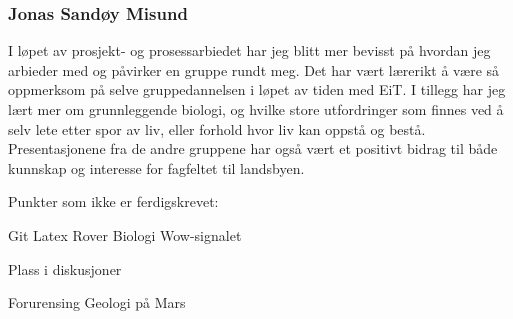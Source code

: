 \subsubsection{Jonas Sandøy Misund}
I løpet av prosjekt- og prosessarbiedet har jeg blitt mer bevisst på hvordan jeg arbieder med og påvirker en gruppe rundt meg.
Det har vært lærerikt å være så oppmerksom på selve gruppedannelsen i løpet av tiden med EiT.
I tillegg har jeg lært mer om grunnleggende biologi, og hvilke store utfordringer som finnes ved å selv lete etter spor av liv, eller forhold hvor liv kan oppstå og bestå.
Presentasjonene fra de andre gruppene har også vært et positivt bidrag til både kunnskap og interesse for fagfeltet til landsbyen.

Punkter som ikke er ferdigskrevet:

Git
Latex
Rover
Biologi
Wow-signalet


Plass i diskusjoner




Forurensing
Geologi på Mars



